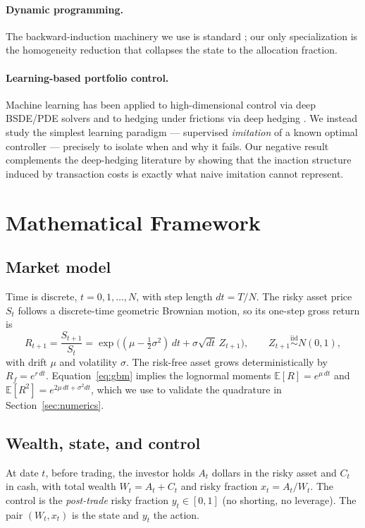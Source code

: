 \documentclass[11pt]{article}
\newcommand{\E}{\mathbb{E}}
\newcommand{\half}{\tfrac{1}{2}}
\begin{document}
\paragraph{Dynamic programming.}
The backward-induction machinery we use is standard \citep{bertsekas2017}; our
only specialization is the homogeneity reduction that collapses the state to the
allocation fraction.

\paragraph{Learning-based portfolio control.}
Machine learning has been applied to high-dimensional control via deep
BSDE/PDE solvers \citep{hanjentzene2018} and to hedging under frictions via deep
hedging \citep{buehler2019deephedging}. We instead study the simplest learning
paradigm --- supervised \emph{imitation} of a known optimal controller
\citep{rossbagnell2011,suttonbarto2018} --- precisely to isolate when and why it
fails. Our negative result complements the deep-hedging literature by showing
that the inaction structure induced by transaction costs is exactly what naive
imitation cannot represent.

\section{Mathematical Framework}
\label{sec:framework}

\subsection{Market model}
Time is discrete, $t=0,1,\dots,N$, with step length $dt=T/N$. The risky asset
price $S_t$ follows a discrete-time geometric Brownian motion, so its one-step
gross return is
\begin{equation}
R_{t+1}=\frac{S_{t+1}}{S_t}
=\exp\!\Big((\mu-\half\sigma^2)\,dt+\sigma\sqrt{dt}\,Z_{t+1}\Big),
\qquad Z_{t+1}\stackrel{\text{iid}}{\sim}N(0,1),
\label{eq:gbm}
\end{equation}
with drift $\mu$ and volatility $\sigma$. The risk-free asset grows
deterministically by $R_f=e^{r\,dt}$. Equation~\eqref{eq:gbm} implies the
lognormal moments $\E[R]=e^{\mu\,dt}$ and $\E[R^2]=e^{2\mu\,dt+\sigma^2 dt}$,
which we use to validate the quadrature in Section~\ref{sec:numerics}.

\subsection{Wealth, state, and control}
At date $t$, before trading, the investor holds $A_t$ dollars in the risky asset
and $C_t$ in cash, with total wealth $W_t=A_t+C_t$ and risky fraction
$x_t=A_t/W_t$. The control is the \emph{post-trade} risky fraction
$y_t\in[0,1]$ (no shorting, no leverage). The pair $(W_t,x_t)$ is the state and
$y_t$ the action.
\end{document}
